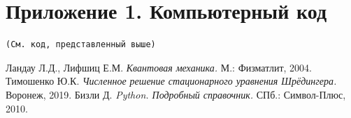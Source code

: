 \documentclass[a4paper, 12pt]{article}
\begin{document}
\newpage
\appendix
\section*{Приложение 1. Компьютерный код}
\begin{verbatim}
(См. код, представленный выше)
\end{verbatim}

\newpage
\begin{thebibliography}{9}
 Ландау Л.Д., Лифшиц Е.М. \textit{Квантовая механика.} М.: Физматлит, 2004.
 Тимошенко Ю.К. \textit{Численное решение стационарного уравнения Шрёдингера.} Воронеж, 2019.
 Бизли Д. \textit{Python. Подробный справочник.} СПб.: Символ-Плюс, 2010.
\end{thebibliography}
\end{document}
